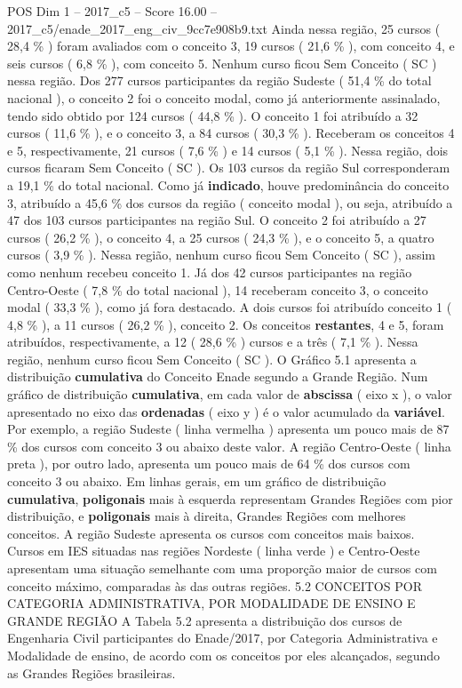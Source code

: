 \begin{textsample}{POS Dim 1 – 2017\_c5 – Score 16.00 – 2017\_c5/enade\_2017\_eng\_civ\_9cc7e908b9.txt}
Ainda nessa região, 25 cursos ( 28,4 \% ) foram avaliados com o conceito 3, 19 cursos ( 21,6 \% ), com conceito 4, e seis cursos ( 6,8 \% ), com conceito 5.
Nenhum curso ficou Sem Conceito ( SC ) nessa região.
Dos 277 cursos participantes da região Sudeste ( 51,4 \% do total nacional ), o conceito 2 foi o conceito modal, como já anteriormente assinalado, tendo sido obtido por 124 cursos ( 44,8 \% ).
O conceito 1 foi atribuído a 32 cursos ( 11,6 \% ), e o conceito 3, a 84 cursos ( 30,3 \% ).
Receberam os conceitos 4 e 5, respectivamente, 21 cursos ( 7,6 \% ) e 14 cursos ( 5,1 \% ).
Nessa região, dois cursos ficaram Sem Conceito ( SC ).
Os 103 cursos da região Sul corresponderam a 19,1 \% do total nacional.
Como já \textbf{indicado}, houve predominância do conceito 3, atribuído a 45,6 \% dos cursos da região ( conceito modal ), ou seja, atribuído a 47 dos 103 cursos participantes na região Sul.
O conceito 2 foi atribuído a 27 cursos ( 26,2 \% ), o conceito 4, a 25 cursos ( 24,3 \% ), e o conceito 5, a quatro cursos ( 3,9 \% ).
Nessa região, nenhum curso ficou Sem Conceito ( SC ), assim como nenhum recebeu conceito 1.
Já dos 42 cursos participantes na região Centro-Oeste ( 7,8 \% do total nacional ), 14 receberam conceito 3, o conceito modal ( 33,3 \% ), como já fora destacado.
A dois cursos foi atribuído conceito 1 ( 4,8 \% ), a 11 cursos ( 26,2 \% ), conceito 2.
Os conceitos \textbf{restantes}, 4 e 5, foram atribuídos, respectivamente, a 12 ( 28,6 \% ) cursos e a três ( 7,1 \% ).
Nessa região, nenhum curso ficou Sem Conceito ( SC ).
O Gráfico 5.1 apresenta a distribuição \textbf{cumulativa} do Conceito Enade segundo a Grande Região.
Num gráfico de distribuição \textbf{cumulativa}, em cada valor de \textbf{abscissa} ( eixo x ), o valor apresentado no eixo das \textbf{ordenadas} ( eixo y ) é o valor acumulado da \textbf{variável}.
Por exemplo, a região Sudeste ( linha vermelha ) apresenta um pouco mais de 87 \% dos cursos com conceito 3 ou abaixo deste valor.
A região Centro-Oeste ( linha preta ), por outro lado, apresenta um pouco mais de 64 \% dos cursos com conceito 3 ou abaixo.
Em linhas gerais, em um gráfico de distribuição \textbf{cumulativa}, \textbf{poligonais} mais à esquerda representam Grandes Regiões com pior distribuição, e \textbf{poligonais} mais à direita, Grandes Regiões com melhores conceitos.
A região Sudeste apresenta os cursos com conceitos mais baixos.
Cursos em IES situadas nas regiões Nordeste ( linha verde ) e Centro-Oeste apresentam uma situação semelhante com uma proporção maior de cursos com conceito máximo, comparadas às das outras regiões. 5.2 CONCEITOS POR CATEGORIA ADMINISTRATIVA, POR MODALIDADE DE ENSINO E GRANDE REGIÃO A Tabela 5.2 apresenta a distribuição dos cursos de Engenharia Civil participantes do Enade/2017, por Categoria Administrativa e Modalidade de ensino, de acordo com os conceitos por eles alcançados, segundo as Grandes Regiões brasileiras.

\end{textsample}
